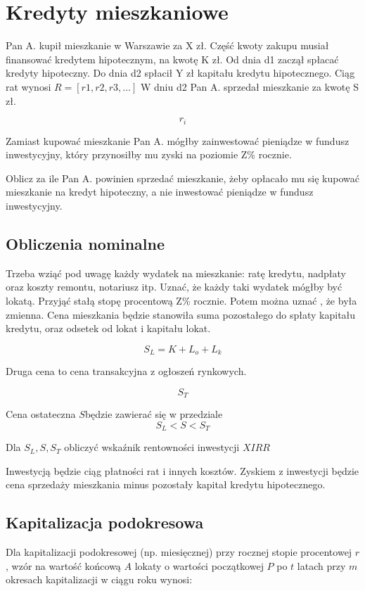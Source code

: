 \section{Kredyty mieszkaniowe}
\label{sec:kredyty}




Pan A. kupił mieszkanie w Warszawie za X zł. Część kwoty zakupu musiał finansować kredytem hipotecznym, na kwotę K zł.
Od dnia d1 zaczął spłacać kredyty hipoteczny.
Do dnia d2 spłacił Y zł kapitału kredytu hipotecznego. Ciąg rat wynosi \(R = [r1, r2, r3, ...]\)
W dniu d2 Pan A. sprzedał mieszkanie za kwotę S zł.

\[ r_i  \]

Zamiast kupować mieszkanie Pan A. mógłby zainwestować pieniądze w fundusz inwestycyjny, który przynosiłby mu zyski na poziomie Z\% rocznie.

Oblicz za ile Pan A. powinien sprzedać mieszkanie, żeby opłacało mu się kupować mieszkanie na kredyt hipoteczny, a nie inwestować pieniądze w fundusz inwestycyjny.

\subsection{Obliczenia nominalne}

Trzeba wziąć pod uwagę każdy wydatek na mieszkanie: ratę kredytu, nadpłaty oraz koszty remontu, notariusz itp. Uznać, że każdy taki wydatek mógłby być lokatą.
Przyjąć stałą stopę procentową Z\% rocznie. Potem można uznać , że była zmienna. Cena mieszkania będzie stanowiła suma pozostałego do spłaty kapitału kredytu, 
oraz odsetek od lokat i kapitału lokat.

\[
S_L = K + L_o + L_k 
\]

Druga cena to cena transakcyjna z ogłoszeń rynkowych.

\[
S_T
\]

Cena ostateczna \(S\)będzie zawierać się w przedziale \[ S_L < S < S_T \]

Dla \(S_L, S, S_T\) obliczyć wskaźnik rentowności inwestycji \(XIRR\)

Inwestycją będzie ciąg płatności rat i innych kosztów. Zyskiem z inwestycji będzie cena sprzedaży mieszkania minus pozostały kapitał kredytu hipotecznego.

\subsection{Kapitalizacja podokresowa}

Dla kapitalizacji podokresowej (np. miesięcznej) przy rocznej stopie procentowej \(r\), wzór na wartość końcową \(A\) lokaty o wartości początkowej \(P\) po \(t\) latach przy \(m\) okresach kapitalizacji w ciągu roku wynosi:


